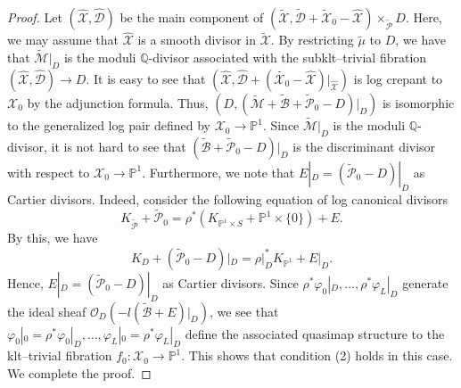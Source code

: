 \documentclass[12pt,twoside]{amsart}
\theoremstyle{definition}
\begin{document}
\begin{proof}
    Let $(\widehat{\mathcal{X}},\widehat{\mathcal{D}})$ be the main component of $(\widetilde{\mathcal{X}},\widetilde{\mathcal{D}}+\widetilde{\mathcal{X}}_0-\widehat{\mathcal{X}})\times_{\widetilde{\mathcal{P}}}D$.
    Here, we may assume that $\widehat{\mathcal{X}}$ is a smooth divisor in $\widetilde{\mathcal{X}}$.
    By restricting $\tilde{\mu}$ to $D$, we have that $\widetilde{\mathcal{M}}|_D$ is the moduli $\mathbb{Q}$-divisor associated with the subklt--trivial fibration $(\widehat{\mathcal{X}},\widehat{\mathcal{D}})\to D$. 
    It is easy to see that $(\widehat{\mathcal{X}},\widehat{\mathcal{D}}+(\widetilde{\mathcal{X}_0}-\widehat{\mathcal{X}})|_{\widehat{\mathcal{X}}})$ is log crepant to $\mathcal{X}_0$ by the adjunction formula.
    Thus, $(D,(\widetilde{\mathcal{M}}+\widetilde{\mathcal{B}}+\widetilde{\mathcal{P}}_0-D)|_D)$ is isomorphic to the generalized log pair defined by $\mathcal{X}_0\to\mathbb{P}^1$.
    Since $\widetilde{\mathcal{M}}|_D$ is the moduli $\mathbb{Q}$-divisor, it is not hard to see that $(\widetilde{\mathcal{B}}+\widetilde{\mathcal{P}}_0-D)|_D$ is the discriminant divisor with respect to $\mathcal{X}_0\to\mathbb{P}^1$.
    Furthermore, we note that $E|_D=(\widetilde{\mathcal{P}}_0-D)|_D$ as Cartier divisors.
    Indeed, consider the following equation of log canonical divisors
    \[
    K_{\widetilde{\mathcal{P}}}+\widetilde{\mathcal{P}}_{0}=\rho^*(K_{\mathbb{P}^1\times S}+\mathbb{P}^1\times\{0\})+E.
    \]
    By this, we have
    \[
    K_{D}+(\widetilde{\mathcal{P}}_{0}-D)|_D=\rho|_D^*K_{\mathbb{P}^1}+E|_D.
    \]
    Hence, $E|_D=(\widetilde{\mathcal{P}}_0-D)|_D$ as Cartier divisors.
    Since $\rho^*\varphi_0|_D,\ldots,\rho^*\varphi_L|_D$ generate the ideal sheaf $\mathcal{O}_{D}(-l(\widetilde{\mathcal{B}}+E)|_D)$, we see that $\varphi_0|_0=\rho^*\varphi_0|_D,\ldots,\varphi_L|_0=\rho^*\varphi_L|_D$ define the associated quasimap structure to the klt--trivial fibration $f_0\colon \mathcal{X}_0\to\mathbb{P}^1$.
    This shows that condition (2) holds in this case.
    We complete the proof.
    \end{proof}
\end{document}
